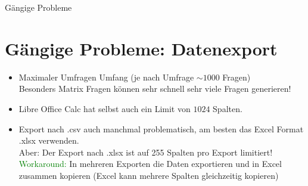 \documentclass[aspectratio=1610, 9pt]{beamer}
\begin{document}
\begin{frame}
	{Gängige Probleme}
	\section{Gängige Probleme: Datenexport}
	\label{sec:Gängige Probleme}
	\begin{itemize}
		\item Maximaler Umfragen Umfang (je nach Umfrage $\sim 1000$ Fragen) \\
			Besonders \alert{Matrix Fragen} können sehr schnell sehr viele Fragen
			generieren!
			\medskip
		\item Libre Office Calc hat selbst auch ein Limit von $1024$ Spalten.
			\medskip
		\item Export nach .csv auch manchmal problematisch, am besten das Excel
			Format .xlsx verwenden.
			\\
			Aber: \alert{Der Export nach .xlsx ist auf 255 Spalten pro Export
			limitiert!}
			\\
			\textcolor<1>{green}{Workaround:} In mehreren Exporten die Daten
			exportieren und in Excel zusammen kopieren (Excel kann mehrere
			Spalten gleichzeitig kopieren)
	\end{itemize}
\end{frame}
\end{document}
